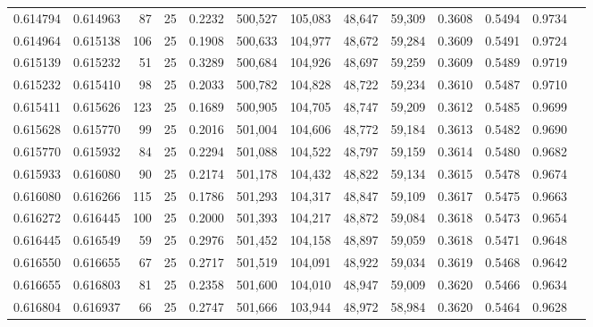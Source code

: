 \begin{tabular}{rrrrrrrrrrrrr}
0.614794 & 0.614963 &    87 &  25 &                                     0.2232 & 500,527 & 105,083 &  48,647 &  59,309 & 0.3608 & 0.5494 & 0.9734 \\
0.614964 & 0.615138 &   106 &  25 &                                     0.1908 & 500,633 & 104,977 &  48,672 &  59,284 & 0.3609 & 0.5491 & 0.9724 \\
0.615139 & 0.615232 &    51 &  25 &                                     0.3289 & 500,684 & 104,926 &  48,697 &  59,259 & 0.3609 & 0.5489 & 0.9719 \\
0.615232 & 0.615410 &    98 &  25 &                                     0.2033 & 500,782 & 104,828 &  48,722 &  59,234 & 0.3610 & 0.5487 & 0.9710 \\
0.615411 & 0.615626 &   123 &  25 &                                     0.1689 & 500,905 & 104,705 &  48,747 &  59,209 & 0.3612 & 0.5485 & 0.9699 \\
0.615628 & 0.615770 &    99 &  25 &                                     0.2016 & 501,004 & 104,606 &  48,772 &  59,184 & 0.3613 & 0.5482 & 0.9690 \\
0.615770 & 0.615932 &    84 &  25 &                                     0.2294 & 501,088 & 104,522 &  48,797 &  59,159 & 0.3614 & 0.5480 & 0.9682 \\
0.615933 & 0.616080 &    90 &  25 &                                     0.2174 & 501,178 & 104,432 &  48,822 &  59,134 & 0.3615 & 0.5478 & 0.9674 \\
0.616080 & 0.616266 &   115 &  25 &                                     0.1786 & 501,293 & 104,317 &  48,847 &  59,109 & 0.3617 & 0.5475 & 0.9663 \\
0.616272 & 0.616445 &   100 &  25 &                                     0.2000 & 501,393 & 104,217 &  48,872 &  59,084 & 0.3618 & 0.5473 & 0.9654 \\
0.616445 & 0.616549 &    59 &  25 &                                     0.2976 & 501,452 & 104,158 &  48,897 &  59,059 & 0.3618 & 0.5471 & 0.9648 \\
0.616550 & 0.616655 &    67 &  25 &                                     0.2717 & 501,519 & 104,091 &  48,922 &  59,034 & 0.3619 & 0.5468 & 0.9642 \\
0.616655 & 0.616803 &    81 &  25 &                                     0.2358 & 501,600 & 104,010 &  48,947 &  59,009 & 0.3620 & 0.5466 & 0.9634 \\
0.616804 & 0.616937 &    66 &  25 &                                     0.2747 & 501,666 & 103,944 &  48,972 &  58,984 & 0.3620 & 0.5464 & 0.9628 \\

\end{tabular}
